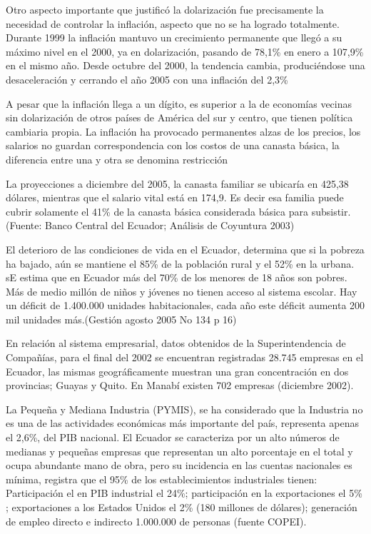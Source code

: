 Otro aspecto importante que justificó la dolarización fue precisamente la necesidad de controlar la inflación, aspecto que no se ha logrado totalmente. Durante 1999 la inflación mantuvo un crecimiento permanente que llegó a su máximo nivel en el 2000, ya en dolarización, pasando de 78,1\% en enero a 107,9\% en el mismo año. Desde octubre del 2000, la tendencia cambia, produciéndose una desaceleración y cerrando el año 2005 con una inflación del 2,3\%

A pesar que la inflación llega a un dígito, es superior a la de economías vecinas sin dolarización  de otros países de América del sur y centro, que tienen política cambiaria propia. La inflación ha provocado permanentes alzas de los precios, los salarios no guardan correspondencia con los costos de una canasta básica, la diferencia entre una y otra se denomina restricción 

La proyecciones a diciembre del 2005, la canasta familiar se ubicaría en 425,38 dólares, mientras que el salario vital está en 174,9. Es decir esa familia puede cubrir solamente el 41\% de la canasta básica considerada básica para subsistir. (Fuente: Banco Central del Ecuador; Análisis de Coyuntura 2003)

El deterioro de las condiciones de vida en el Ecuador, determina  que si  la pobreza ha bajado, aún  se mantiene el 85\%  de la población rural  y el 52\% en la urbana. sE estima que en Ecuador más del 70\% de los menores de 18 años son pobres. Más de medio millón de niños y jóvenes no tienen acceso al sistema escolar. Hay un déficit de 1.400.000 unidades habitacionales, cada año este déficit aumenta 200 mil unidades más.(Gestión agosto 2005 No 134 p 16)

En relación al sistema empresarial, datos obtenidos de la Superintendencia de Compañías, para el final del 2002 se encuentran registradas 28.745 empresas en el Ecuador, las mismas geográficamente muestran una gran concentración en dos provincias; Guayas y Quito. En Manabí  existen  702 empresas (diciembre 2002).

La Pequeña y Mediana Industria (PYMIS), se ha considerado que la  Industria no es una de las actividades económicas más importante del país, representa apenas el 2,6\%, del PIB nacional. El Ecuador se caracteriza por un alto números de medianas y pequeñas empresas que representan un alto porcentaje en el total y ocupa abundante mano de obra, pero su incidencia en las cuentas nacionales es mínima, registra que el 95\% de los establecimientos industriales tienen: Participación el en PIB industrial el 24\%; participación en la exportaciones el 5\% ; exportaciones a los Estados Unidos el 2\% (180 millones de dólares); generación de empleo directo e indirecto 1.000.000 de personas (fuente COPEI).

